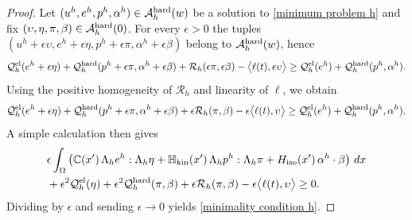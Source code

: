 \documentclass[reqno,10pt]{amsart}
\numberwithin{equation}{section}
\theoremstyle{remark}
\newcommand{\calA}{\mathcal{A}}
\newcommand{\C}{\mathbb{C}}
\newcommand{\calQ}{\mathcal{Q}}
\newcommand{\calR}{\mathcal{R}}
\newcommand{\Hkin}{\mathbb{H}_{\rm kin}}
\newcommand{\Hiso}{H_{\rm iso}}
\begin{document}
\begin{proof}
Let $(u^h, e^h, p^h, \alpha^h) \in \calA_{h}^{\rm hard}(w)$ be a solution to \eqref{minimum problem h} and fix $(\upsilon, \eta, \pi, \beta) \in \calA_{h}^{\rm hard}(0)$. 
For every $\epsilon > 0$ the tuples $(u^h+\epsilon\upsilon, e^h+\epsilon\eta, p^h+\epsilon\pi, \alpha^h+\epsilon\beta)$ belong to $\calA_{h}^{\rm hard}(w)$, hence
\begin{equation*}
	\calQ^{\rm el}_{h}(e^h+\epsilon\eta) + \calQ^{\rm hard}_{h}(p^h+\epsilon\pi, \alpha^h+\epsilon\beta) + \calR_{h}(\epsilon\pi, \epsilon\beta) - \big\langle \ell(t), \epsilon\upsilon \big\rangle
	\geq \calQ^{\rm el}_{h}(e^h) + \calQ^{\rm hard}_{h}(p^h, \alpha^h).
\end{equation*}
Using the positive homogeneity of $\calR_{h}$ and linearity of $\ell$, we obtain
\begin{equation*}
	\calQ^{\rm el}_{h}(e^h+\epsilon\eta) + \calQ^{\rm hard}_{h}(p^h+\epsilon\pi, \alpha^h+\epsilon\beta) + \epsilon\calR_{h}(\pi, \beta) - \epsilon\big\langle \ell(t), \upsilon \big\rangle
	\geq \calQ^{\rm el}_{h}(e^h) + \calQ^{\rm hard}_{h}(p^h, \alpha^h).
\end{equation*}
A simple calculation then gives
\begin{align*}
	& \epsilon\int_{\Omega} \left( \C\!\left(x'\right) \Lambda_h e^h : \Lambda_h \eta + \Hkin\!\left(x'\right) \Lambda_h p^h : \Lambda_h \pi + \Hiso\!\left(x'\right) \alpha^h \cdot \beta \right) \,dx
	\\& + \epsilon^2\calQ^{\rm el}_{h}(\eta) + \epsilon^2\calQ^{\rm hard}_{h}(\pi, \beta) + \epsilon\calR_{h}(\pi, \beta) - \epsilon\big\langle \ell(t), \upsilon \big\rangle 
	\geq 0.
\end{align*}
Dividing by $\epsilon$ and sending $\epsilon \to 0$ yields \eqref{minimality condition h}. 


\end{proof}
\end{document}
